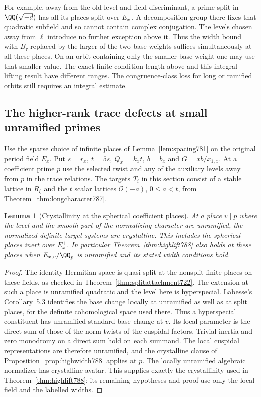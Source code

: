 \documentclass[a4paper,11pt]{article}
\newtheorem{lemma}[proposition]{Lemma}
\theoremstyle{definition}
\theoremstyle{remark}
\numberwithin{equation}{section}
\begin{document}
For example, away from the old level and field
discriminant, a prime split in \(\QQ(\sqrt{-d})\)
has all its places split over \(E_x^+\). A decomposition
group there fixes that quadratic subfield and so cannot
contain complex conjugation. The levels chosen away from
\(\ell\) introduce no further exception above it. Thus
the width bound with \(B_\tau\) replaced by the larger
of the two base weights suffices simultaneously at all
these places. On an orbit containing only the smaller
base weight one may use that smaller value. The exact
finite-condition length above and this integral lifting
result have different ranges. The congruence-class
loss for long or ramified orbits still requires an
integral estimate.
\clearpage

\subsection{The higher-rank trace defects at small unramified primes}
\label{sec:highsmall789}
Use the sparse choice of infinite places of
Lemma~\ref{lem:spacing781} on the original period field
\(E_x\). Put \(s=r_x,\ t=5s,\ Q_x=k_x t,\ b=b_x\)
and \(G=xb/x_{1,x}\). At a coefficient prime \(p\)
use the selected twist and any of the auxiliary levels
away from \(p\) in the trace relations. The targets
\(T_i\) in this section consist of a stable lattice
in \(R_\xi\) and the \(t\) scalar lattices
\(\mathcal O(-a)\), \(0\le a<t\), from
Theorem~\ref{thm:longcharacter787}.

\begin{lemma}[Crystallinity at the spherical coefficient places]
\leavevmode\label{lem:inertcrys789}
At a place \(v\mid p\) where the level and the smooth
part of the normalizing character are unramified, the
normalized definite target systems are crystalline.
This includes the spherical places inert over \(E_x^+\).
In particular Theorem~\ref{thm:highlift788} also holds
at these places when \(E_{x,v}/\QQ_p\) is unramified
and its stated width conditions hold.
\end{lemma}
\begin{proof}
The identity Hermitian space is quasi-split at the
nonsplit finite places on these fields, as checked in
Theorem~\ref{thm:splitattachment722}. The extension at
such a place is unramified quadratic and the level
here is hyperspecial. Labesse's Corollary~5.3 identifies
the base change locally at unramified as well as at
split places, for the definite cohomological space
used there. Thus a hyperspecial constituent has
unramified standard base change at \(v\).
\cite[Corollaire~5.3]{III-II-labessesph789}
Its local parameter is the direct sum of those of
the norm twists of the cuspidal factors. Trivial
inertia and zero monodromy on a direct sum hold on
each summand. The local cuspidal representations
are therefore unramified, and the crystalline clause
of Proposition~\ref{prop:highwidth788} applies at \(p\).
The locally unramified algebraic normalizer has
crystalline avatar. This supplies exactly the
crystallinity used in Theorem~\ref{thm:highlift788};
its remaining hypotheses and proof use only the local
field and the labelled widths.
\end{proof}
\end{document}
